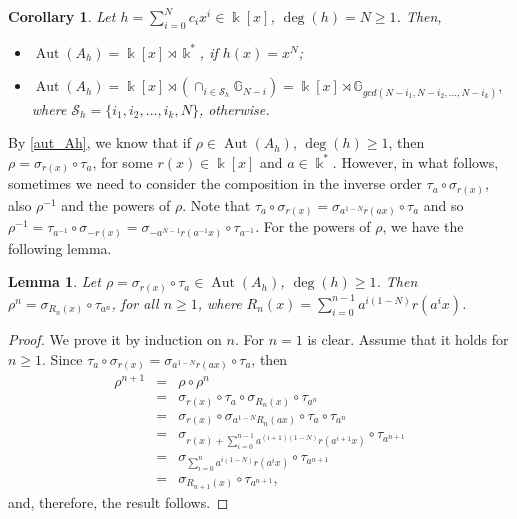 \documentclass{article}
\numberwithin{equation}{section}\theoremstyle{plain}
\newtheorem{corollary}[theorem]{Corollary}
\newtheorem{lemma}[theorem]{Lemma}
\DeclareMathOperator{\Aut}{Aut}
\begin{document}
\begin{corollary}\label{carac_Aut}
Let $h = \sum_{i=0}^{N}c_ix^i \in  \Bbbk[x]$, $\deg(h) = N \geq 1$.
Then,
\begin{itemize}
    \item[i)] $\Aut(A_h) = \Bbbk[x] \rtimes \Bbbk^\ast$, if $h(x)=x^N$; 
    \item[ii)] $\Aut(A_h) = \Bbbk[x] \rtimes \left(\cap_{i \in \mathcal{S}_h}\mathbb{G}_{N-i}\right) = \Bbbk[x] \rtimes \mathbb{G}_{gcd(N-i_1, N-i_2, ..., N-i_k)},$ where $\mathcal{S}_h = \{i_1, i_2, ..., i_k, N \}$, otherwise.
\end{itemize}
\end{corollary}

\medbreak 

By \eqref{aut_Ah}, we know that if $\rho \in \Aut(A_h)$, $\deg(h)\geq 1$, then $\rho = \sigma_{r(x)} \circ \tau_a$, for some $r(x) \in \Bbbk[x]$ and $a \in \Bbbk^\ast$.
However, in what follows, sometimes we need to consider the composition in the inverse order $\tau_a \circ \sigma_{r(x)}$, also $\rho^{-1}$ and the powers of $\rho$.
Note that $\tau_a \circ \sigma_{r(x)} = \sigma_{a^{1-N} r (ax)} \circ \tau_a$ and so $\rho^{-1} = \tau_{a^{-1}} \circ \sigma_{-r(x)} = \sigma_{-a^{N-1}r(a^{-1}x)} \circ \tau_{a^{-1}}$.
For the powers of $\rho$, we have the following lemma.

\begin{lemma}\label{rho_n}
 Let $\rho= \sigma_{r(x)}\circ \tau_a\in \Aut(A_h)$, $\deg(h)\geq 1$. 
Then 
$\rho^n = \sigma_{R_n(x)} \circ \tau_{a^n}$, for all $n\geq 1$, where $R_n(x) = \sum_{i=0}^{n-1} a^{i(1-N)} r(a^i x)$. 
    \end{lemma}
    \begin{proof}
 We prove it by induction on $n$.
  For $n=1$ is clear.    
Assume that it holds for $n\geq 1$.
Since $\tau_a \circ \sigma_{r(x)} = \sigma_{a^{1-N} r (ax)} \circ \tau_a$, then
    \begin{eqnarray*}
        \rho^{n+1}&=& \rho\circ\rho^n\\
        &=& \sigma_{r(x)}\circ\tau_a\circ\sigma_{R_n(x)}\circ\tau_{a^n}\\
        &=& \sigma_{r(x)}\circ\sigma_{a^{1-N}R_n(ax)}\circ\tau_a\circ\tau_{a^n}\\
        &=& \sigma_{r(x)+ \sum_{i=0}^{n-1} a^{(i+1)(1-N)} r(a^{i+1} x)}\circ\tau_{a^{n+1}}\\
        &=& \sigma_{ \sum_{i=0}^{n} a^{i(1-N)} r(a^i x)}\circ\tau_{a^{n+1}}\\
        &=& \sigma_{R_{n+1}(x)} \circ \tau_{a^{n+1}},
    \end{eqnarray*}
    and, therefore, the result follows.
     \end{proof}
\end{document}
